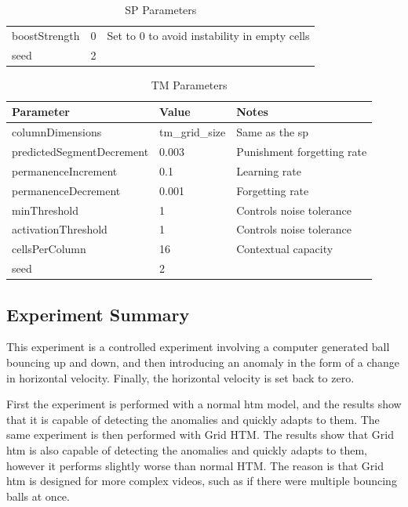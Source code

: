 \begin{table}[H]
\begin{tabularx}{\linewidth}{@{}XlX@{}}
        boostStrength      & 0              & Set to 0 to avoid instability in empty cells                                                                                                          \\
        seed               & 2              &                                                                                                                                                       \\
        \bottomrule
    \end{tabularx}
    \caption{SP Parameters}
    \label{tab:bb_sp_gridhtm_param}
\end{table}
\begin{table}[H]
    \centering
    \begin{tabularx}{\linewidth}{@{}XlX@{}}
        \toprule
        \textbf{Parameter}        & \textbf{Value} & \textbf{Notes}             \\
        \midrule
        columnDimensions          & tm\_grid\_size & Same as the \gls*{sp}      \\
        predictedSegmentDecrement & 0.003          & Punishment forgetting rate \\
        permanenceIncrement       & 0.1            & Learning rate              \\
        permanenceDecrement       & 0.001          & Forgetting rate            \\
        minThreshold              & 1              & Controls noise tolerance   \\
        activationThreshold       & 1              & Controls noise tolerance   \\
        cellsPerColumn            & 16             & Contextual capacity        \\
        seed                      & 2              &                            \\
        \bottomrule
    \end{tabularx}
    \caption{TM Parameters}
    \label{tab:bb_tm_gridhtm_param}
\end{table}
\subsection{Experiment Summary}
This experiment is a controlled experiment involving a computer generated ball bouncing up and down, and then introducing an anomaly in the form of a change in horizontal velocity. Finally, the horizontal velocity is set back to zero.
\par
First the experiment is performed with a normal \gls*{htm} model, and the results show that it is capable of detecting the anomalies and quickly adapts to them. The same experiment is then performed with Grid HTM. The results show that Grid \gls*{htm} is also capable of detecting the anomalies and quickly adapts to them, however it performs slightly worse than normal HTM. The reason is that Grid \gls*{htm} is designed for more complex videos, such as if there were multiple bouncing balls at once.
\clearpage
